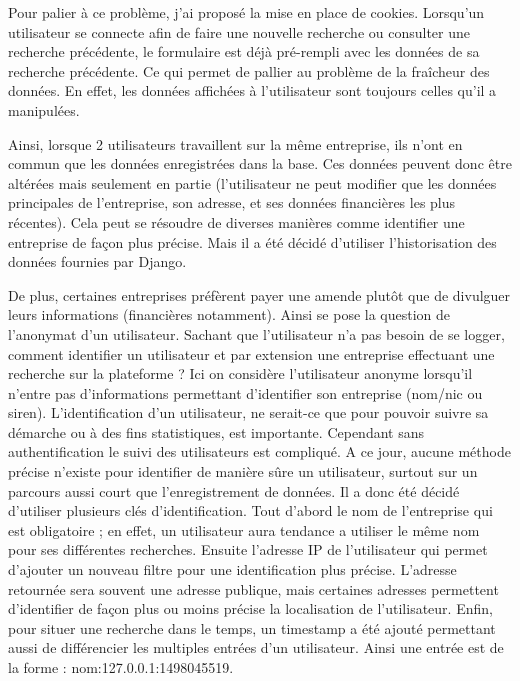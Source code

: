\documentclass[french]{article}
\begin{document}
{Pour palier à ce problème, j'ai proposé la mise en place de cookies. Lorsqu'un utilisateur se connecte afin de faire une nouvelle recherche ou consulter une recherche précédente, le formulaire est déjà pré-rempli avec les données de sa recherche précédente. Ce qui permet de pallier au problème de la fraîcheur des données. En effet, les données affichées à l'utilisateur sont toujours celles qu'il a manipulées.

Ainsi, lorsque 2 utilisateurs travaillent sur la même entreprise, ils n'ont en commun que les données enregistrées dans la base. Ces données peuvent donc être altérées mais seulement en partie (l'utilisateur ne peut modifier que les données principales de l'entreprise, son adresse, et ses données financières les plus récentes). Cela peut se résoudre de diverses manières comme identifier une entreprise de façon plus précise. Mais il a été décidé d'utiliser l'historisation des données fournies par Django.

De plus, certaines entreprises préfèrent payer une amende plutôt que de divulguer leurs informations (financières notamment). Ainsi se pose la question de l'anonymat d'un utilisateur. Sachant que l'utilisateur n'a pas besoin de se logger, comment identifier un utilisateur et par extension une entreprise effectuant une recherche sur la plateforme ? Ici on considère l'utilisateur anonyme lorsqu'il n'entre pas d'informations permettant d'identifier son entreprise (nom/nic ou siren). L'identification d'un utilisateur, ne serait-ce que pour pouvoir suivre sa démarche ou à des fins statistiques, est importante. Cependant sans authentification le suivi des utilisateurs est compliqué. A ce jour, aucune méthode précise n'existe pour identifier de manière sûre un utilisateur, surtout sur un parcours aussi court que l'enregistrement de données. Il a donc été décidé d'utiliser plusieurs clés d'identification. Tout d'abord le nom de l'entreprise qui est obligatoire ; en effet, un utilisateur aura tendance a utiliser le même nom pour ses différentes recherches. Ensuite l'adresse IP de l'utilisateur qui permet d'ajouter un nouveau filtre pour une identification plus précise. L'adresse retournée sera souvent une adresse publique, mais certaines adresses permettent d'identifier de façon plus ou moins précise la localisation de l'utilisateur. Enfin, pour situer une recherche dans le temps, un timestamp a été ajouté permettant aussi de différencier les multiples entrées d'un utilisateur.
Ainsi une entrée est de la forme : nom:127.0.0.1:1498045519.

}
\end{document}
